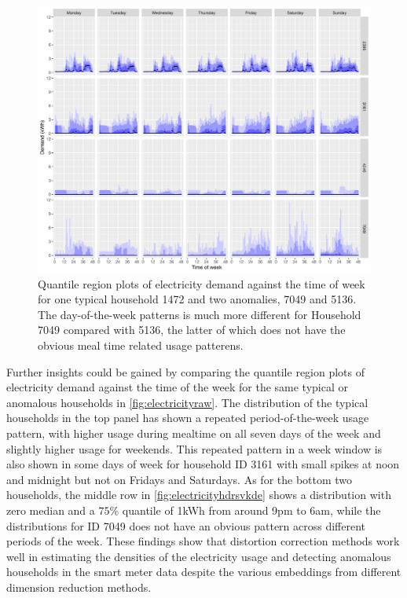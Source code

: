 \documentclass[11pt,a4paper,]{article}
\begin{document}
\begin{figure}

{\centering \includegraphics[width=0.9\linewidth]{figures/Electricity_2d_plot_hdrbox_7dow_4id_1typical_3anomalous} 

}

\caption{Quantile region plots of electricity demand against the time of week for one typical household 1472 and two anomalies, 7049 and 5136. The day-of-the-week patterns is much more different for Household 7049 compared with 5136, the latter of which does not have the obvious meal time related usage patterens.}\label{fig:electricityhdrsvkde}
\end{figure}

Further insights could be gained by comparing the quantile region plots of electricity demand against the time of the week for the same typical or anomalous households in \autoref{fig:electricityraw}. The distribution of the typical households in the top panel has shown a repeated period-of-the-week usage pattern, with higher usage during mealtime on all seven days of the week and slightly higher usage for weekends.
This repeated pattern in a week window is also shown in some days of week for household ID 3161 with small spikes at noon and midnight but not on Fridays and Saturdays. As for the bottom two households, the middle row in \autoref{fig:electricityhdrsvkde} shows a distribution with zero median and a \(75\%\) quantile of 1kWh from around 9pm to 6am, while the distributions for ID 7049 does not have an obvious pattern across different periods of the week. These findings show that distortion correction methods work well in estimating the densities of the electricity usage and detecting anomalous households in the smart meter data despite the various embeddings from different dimension reduction methods.
\end{document}
